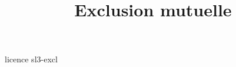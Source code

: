 \documentclass [xcolor=table] {beamer}
\title {Exclusion mutuelle}
\begin{document}
 {licence}
 {sl3-excl}
\end{document}
